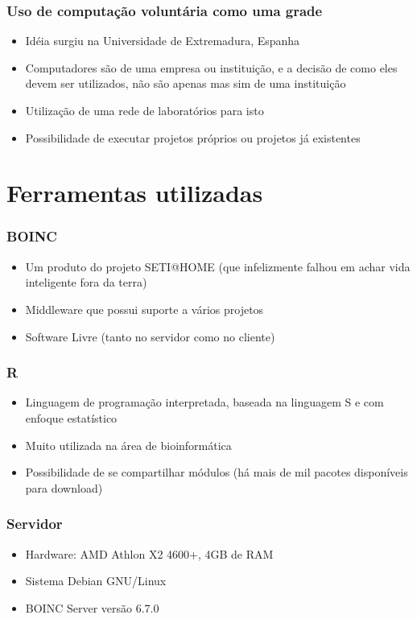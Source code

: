 \documentclass{beamer}
\begin{document}
\begin{frame}
  \frametitle{Uso de computação voluntária como uma grade}
  \begin{itemize}
    \item Idéia surgiu na Universidade de Extremadura, Espanha
    \item Computadores são de uma empresa ou instituição, e a decisão de como eles devem ser utilizados, não são apenas mas sim de uma instituição
    \item Utilização de uma rede de laboratórios para isto
    \item Possibilidade de executar projetos próprios ou projetos já existentes
  \end{itemize}
\end{frame}


\section{Ferramentas utilizadas}

\begin{frame}
  \frametitle{BOINC}
  \begin{itemize}
    \item Um produto do projeto SETI@HOME (que infelizmente falhou em achar vida inteligente fora da terra)
    \item Middleware que possui suporte a vários projetos 
    \item Software Livre (tanto no servidor como no cliente)
  \end{itemize}
\end{frame}

\begin{frame}
  \frametitle{R}
  \begin{itemize}
    \item Linguagem de programação interpretada, baseada na linguagem S e com enfoque estatístico
    \item Muito utilizada na área de bioinformática
    \item Possibilidade de se compartilhar módulos (há mais de mil pacotes disponíveis para download) 
  \end{itemize}

\end{frame}

\begin{frame}
  \frametitle{Servidor}
  \begin{itemize}
    \item Hardware: AMD Athlon X2 4600+, 4GB de RAM %
    \item Sistema Debian GNU/Linux
    \item BOINC Server versão 6.7.0
  \end{itemize}
\end{frame}
\end{document}
